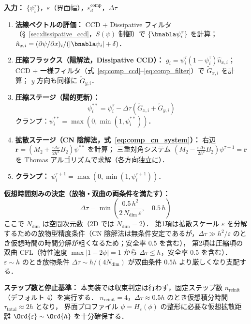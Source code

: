 \begin{tcolorbox}[algbox, title={CLS 再初期化の Dissipative CCD スキーム（1 仮想時間ステップ）}]
\label{alg:cls_reinit_dccd}

\textbf{入力：} $\{\psi_i^\tau\}$，$\varepsilon$（界面幅），$\varepsilon_d^{\mathrm{comp}}$，$\Delta\tau$

\begin{enumerate}
  \item \textbf{法線ベクトルの評価：}
        CCD + Dissipative フィルタ（§~\ref{sec:dissipative_ccd}，$S(\psi)$ 制御）で
        $\{\bnabla\psi_i^\tau\}$ を計算；$\hat{n}_{x,i} = (\partial\psi/\partial x)_i / (|\bnabla\psi_i| + \delta)$．

  \item \textbf{圧縮フラックス（陽解法，Dissipative CCD）：}
        $g_i = \psi_i^\tau(1-\psi_i^\tau)\hat{n}_{x,i}$；
        CCD + 一様フィルタ（式~\eqref{eq:comp_ccd}--\eqref{eq:comp_filter}）で $\tilde{G}_{x,i}$ を計算；
        $y$ 方向も同様に $\tilde{G}_{y,i}$．

  \item \textbf{圧縮ステージ（陽的更新）：}
        \[
          \psi_i^{**} = \psi_i^\tau - \Delta\tau\!\left(\tilde{G}_{x,i} + \tilde{G}_{y,i}\right)
        \]
        クランプ：$\psi_i^{**} = \max(0,\min(1,\psi_i^{**}))$．

  \item \textbf{拡散ステージ（CN 陰解法，式~\eqref{eq:comp_cn_system}）：}
        右辺 $\bm{r} = (M_2 + \frac{\varepsilon\Delta\tau}{2h^2}B_2)\psi^{**}$ を計算；
        三重対角システム $(M_2 - \frac{\varepsilon\Delta\tau}{2h^2}B_2)\psi^{\tau+1} = \bm{r}$
        を Thomas アルゴリズムで求解（各方向独立に）．

  \item \textbf{クランプ：} $\psi_i^{\tau+1} = \max(0,\min(1,\psi_i^{\tau+1}))$．
\end{enumerate}

\textbf{仮想時間刻みの決定（放物・双曲の両条件を満たす）：}
\begin{equation}
  \Delta\tau = \min\!\left(
    \frac{0.5\,h^2}{2\,N_{\mathrm{dim}}\,\varepsilon},\quad
    0.5\,h
  \right)
  \label{eq:dtau_reinit_def}
\end{equation}
ここで $N_{\mathrm{dim}}$ は空間次元数（2D では $N_{\mathrm{dim}}=2$）．
第1項は拡散スケール $\varepsilon$ を分解するための放物型精度条件（CN 陰解法は無条件安定であるが，$\Delta\tau \gg h^2/\varepsilon$ のとき仮想時間の時間分解が粗くなるため；安全率 0.5 を含む），
第2項は圧縮項の双曲 CFL（特性速度 $\max|1-2\psi| = 1$ から $\Delta\tau \leq h$，安全率 0.5 を含む）．
$\varepsilon \sim h$ のとき放物条件 $\Delta\tau \sim h/(4N_{\mathrm{dim}})$ が双曲条件 $0.5h$ より厳しくなり支配する．

\textbf{ステップ数と停止基準：}
本実装では収束判定は行わず，固定ステップ数 $n_{\mathrm{reinit}}$（デフォルト 4）を実行する．
$n_{\mathrm{reinit}} = 4$，$\Delta\tau \approx 0.5h$ のとき仮想積分時間 $\tau_{\mathrm{total}} \approx 2h$ となり，
界面プロファイル $\psi = H_\varepsilon(\phi)$ の整形に必要な仮想拡散距離 $\Ord{\varepsilon} \sim \Ord{h}$ を十分確保する．
\end{tcolorbox}

